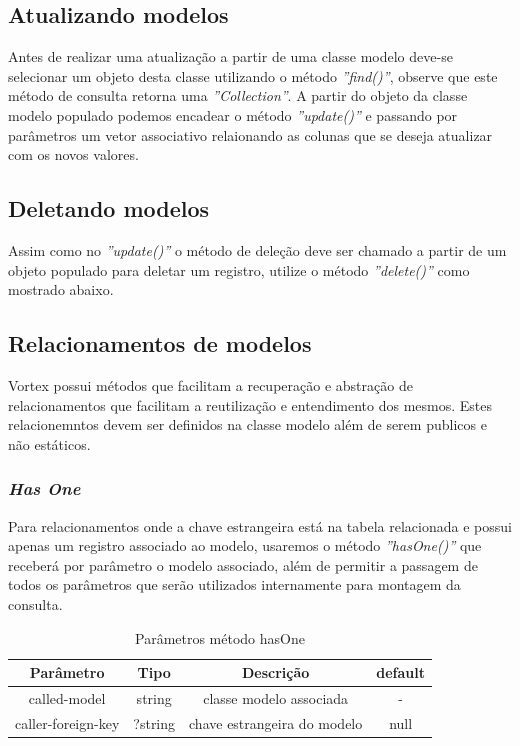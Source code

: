 \subsection{Atualizando modelos}

Antes de realizar uma atualização a partir de uma classe modelo deve-se selecionar um objeto desta classe utilizando o método \textit{''find()''}, observe que este método de consulta retorna uma \textit{''Collection''}. A partir do objeto da classe modelo populado podemos encadear o método \textit{''update()''} e passando por parâmetros um vetor associativo relaionando as colunas que se deseja atualizar com os novos valores.

\spaceH{}

\label{scripts/model_update.php}

\subsection{Deletando modelos}

Assim como no \textit{''update()''} o método de deleção deve ser chamado a partir de um objeto populado para deletar um registro, utilize o método \textit{''delete()''} como mostrado abaixo.

\spaceH{}

\label{scripts/model_delete.php}

\subsection{Relacionamentos de modelos}
Vortex possui métodos que facilitam a recuperação e abstração de relacionamentos que facilitam a reutilização e entendimento dos mesmos. Estes relacionemntos devem ser definidos na classe modelo além de serem publicos e não estáticos.

\subsubsection{\textit{Has One}}
Para relacionamentos onde a chave estrangeira está na tabela relacionada e possui apenas um registro associado ao modelo, usaremos o método \textit{''hasOne()''} que receberá por parâmetro o modelo associado, além de permitir a passagem de todos os parâmetros que serão utilizados internamente para montagem da consulta.

\begin{table}[H]
\centering
\vspace{0.5cm}
\begin{tabular}{|c|c|c|c|}
\hline  
Parâmetro & Tipo & Descrição & default\\
\hline 
called-model       & string & classe modelo associada     & -\\
caller-foreign-key & ?string & chave estrangeira do modelo & null\\
\hline
\end{tabular}
\caption{Parâmetros método hasOne}
\end{table}

